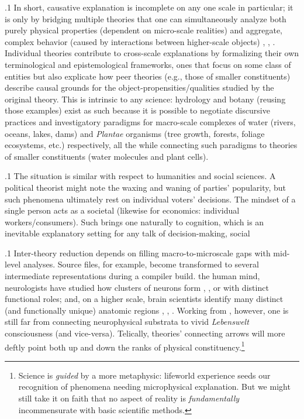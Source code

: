 \documentclass[11pt, twocolumn]{article}
\begin{document}
\p.1{%
In short, causative explanation is incomplete on any one scale in
particular; it is only by bridging multiple theories that one can
simultaneously analyze both purely physical properties (dependent
on micro-scale realities) and aggregate, complex behavior
(caused by interactions between higher-scale objects)
, , . Individual
theories contribute to cross-scale explanations by formalizing
their own terminological and epistemological frameworks, ones
that focus on some class of entities but also explicate how
peer theories (e.g., those of smaller constituents) describe
causal grounds for the object-propensities/qualities studied by
the original theory. This is intrinsic to any science: hydrology
and botany (reusing those examples) exist as such because it
is possible to negotiate discursive practices and investigatory paradigms
for macro-scale complexes of water (rivers, oceans, lakes, dams)
and \textit{Plantae} organisms (tree growth, forests, foliage ecosystems, etc.) respectively, all the
while connecting such paradigms to theories of smaller constituents
(water molecules and plant cells).
}%

\p.1{%
The situation is similar with respect to humanities and social sciences.
A political theorist might note the waxing and waning of parties' popularity,
but such phenomena ultimately rest on individual voters' decisions.
The mindset of a single person acts as a societal 
(likewise for economics: individual workers/consumers). Such brings
one naturally to cognition, which is an inevitable explanatory
setting for any talk of decision-making, social 
}%

\p.1{%
Inter-theory reduction depends on filling macro-to-microscale gaps with mid-level
analyses. Source files, for example,
become transformed to several intermediate representations during a compiler build. \Visavis{} the
human mind, neurologists have studied how clusters of neurons
form , , or  with distinct functional roles; and,
on a higher scale, brain scientists identify many distinct
(and functionally unique) anatomic regions ,
, . Working from
, however, one is still far from connecting
neurophysical substrata to vivid \textit{Lebenswelt}
consciousness (and vice-versa). Telically,
theories' connecting arrows will more deftly point both up and
down the ranks of physical constituency.\footnote{Science is \textit{guided} by a more
 metaphysic: \label{fn:scienceGuided}lifeworld
experience seeds our
recognition of phenomena needing microphysical explanation. But we might still take it on faith that
no aspect of reality is \textit{fundamentally} incommensurate
with basic scientific methods.}\condenlargepage{2em}
}%
\end{document}
